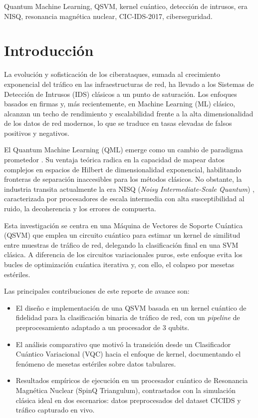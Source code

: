 \documentclass[10pt,conference]{IEEEtran}
\begin{document}
\begin{IEEEkeywords}
Quantum Machine Learning, QSVM, kernel cuántico, detección de intrusos,
era NISQ, resonancia magnética nuclear, CIC-IDS-2017, ciberseguridad.
\end{IEEEkeywords}

\section{Introducción}
La evolución y sofisticación de los ciberataques, sumada al crecimiento
exponencial del tráfico en las infraestructuras de red, ha llevado a los
Sistemas de Detección de Intrusos (IDS) clásicos a un punto de
saturación. Los enfoques basados en firmas y, más recientemente, en
Machine Learning (ML) clásico, alcanzan un techo de rendimiento y
escalabilidad frente a la alta dimensionalidad de los datos de red
modernos, lo que se traduce en tasas elevadas de falsos positivos y
negativos.

El Quantum Machine Learning (QML) emerge como un cambio de paradigma
prometedor \cite{biamonte2017}. Su ventaja teórica radica en la
capacidad de mapear datos complejos en espacios de Hilbert de
dimensionalidad exponencial, habilitando fronteras de separación
inaccesibles para los métodos clásicos. No obstante, la industria
transita actualmente la era NISQ (\textit{Noisy Intermediate-Scale
Quantum}) \cite{preskill2018}, caracterizada por procesadores de escala
intermedia con alta susceptibilidad al ruido, la decoherencia y los
errores de compuerta.

Esta investigación se centra en una Máquina de Vectores de Soporte
Cuántica (QSVM) que emplea un circuito cuántico para estimar un kernel
de similitud entre muestras de tráfico de red, delegando la
clasificación final en una SVM clásica. A diferencia de los circuitos
variacionales puros, este enfoque evita los bucles de optimización
cuántica iterativa y, con ello, el colapso por mesetas estériles.

Las principales contribuciones de este reporte de avance son:
\begin{itemize}
  \item El diseño e implementación de una QSVM basada en un kernel
  cuántico de fidelidad para la clasificación binaria de tráfico de
  red, con un \textit{pipeline} de preprocesamiento adaptado a un
  procesador de 3 qubits.
  \item El análisis comparativo que motivó la transición desde un
  Clasificador Cuántico Variacional (VQC) hacia el enfoque de kernel,
  documentando el fenómeno de mesetas estériles sobre datos tabulares.
  \item Resultados empíricos de ejecución en un procesador cuántico de
  Resonancia Magnética Nuclear (SpinQ Triangulum), contrastados con la
  simulación clásica ideal en dos escenarios: datos preprocesados del
  dataset CICIDS y tráfico capturado en vivo.
\end{itemize}
\end{document}
